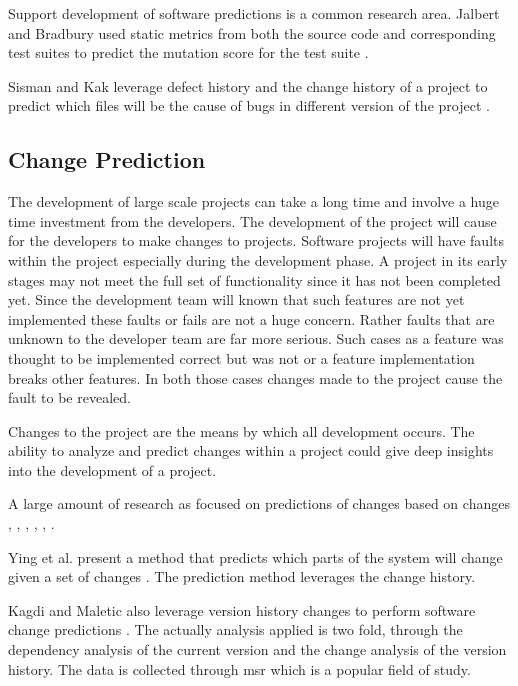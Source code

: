 Support development of software predictions is a common research area. Jalbert and Bradbury used static metrics from both the source code and corresponding test suites to predict the mutation score for the test suite \cite{Jalbert2012}.

Sisman and Kak leverage defect history and the change history of a project to predict which files will be the cause of bugs in different version of the project \cite{Sisman2012}.

\subsection{Change Prediction}

The development of large scale projects can take a long time and involve a huge time investment from the developers. The development of the project will cause for the developers to make changes to projects. Software projects will have faults within the project especially during the development phase. A project in its early stages may not meet the full set of functionality since it has not been completed yet. Since the development team will known that such features are not yet implemented these faults or fails are not a huge concern. Rather faults that are unknown to the developer team are far more serious. Such cases as a feature was thought to be implemented correct but was not or a feature implementation breaks other features. In both those cases changes made to the project cause the fault to be revealed.

Changes to the project are the means by which all development occurs. The ability to analyze and predict changes within a project could give deep insights into the development of a project.


A large amount of research as focused on predictions of changes based on changes \cite{Bantelay2013}, \cite{Chaturvedi2014}, \cite{Giger2012}, \cite{Hassan2004}, \cite{Kagdi2007}, \cite{Ying2004}. 

Ying et al. present a method that predicts which parts of the system will change given a set of changes \cite{Ying2004}. The prediction method leverages the change history.

Kagdi and Maletic also leverage version history changes to perform software change predictions \cite{Kagdi2007}. The actually analysis applied is two fold, through the dependency analysis of the current version and the change analysis of the version history. The data is collected through \gls{msr} which is a popular field of study. 

